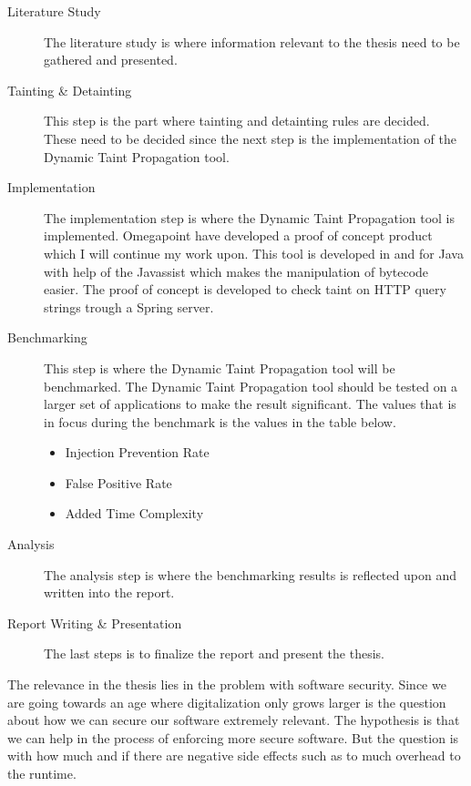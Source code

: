 \documentclass{../kththesis}
\begin{document}
\begin{description}  
	\item [Literature Study]
	The literature study is where information relevant to the thesis need to be gathered and presented.

	\item [Tainting \& Detainting]
	This step is the part where tainting and detainting rules are decided. These need to be decided since the next step is the implementation of the Dynamic Taint Propagation tool.

	\item [Implementation]
	The implementation step is where the Dynamic Taint Propagation tool is implemented. Omegapoint have developed a proof of concept product which I will continue my work upon. This tool is developed in and for Java with help of the Javassist \parencite{javassist} which makes the manipulation of bytecode easier. The proof of concept is developed to check taint on HTTP query strings trough a Spring server.

	\item [Benchmarking]
	This step is where the Dynamic Taint Propagation tool will be benchmarked. The Dynamic Taint Propagation tool should be tested on a larger set of applications to make the result significant. The values that is in focus during the benchmark is the values in the table below. 
	
	\begin{itemize}  
		\item Injection Prevention Rate 
		\item False Positive Rate
		\item Added Time Complexity
	\end{itemize}

	\item [Analysis]
	The analysis step is where the benchmarking results is reflected upon and written into the report.

	\item [Report Writing \& Presentation]
	The last steps is to finalize the report and present the thesis.
\end{description}

\noindent
The relevance in the thesis lies in the problem with software security. Since we are going towards an age where digitalization only grows larger is the question about how we can secure our software extremely relevant. The hypothesis is that we can help in the process of enforcing more secure software. But the question is with how much and if there are negative side effects such as to much overhead to the runtime.
\end{document}
